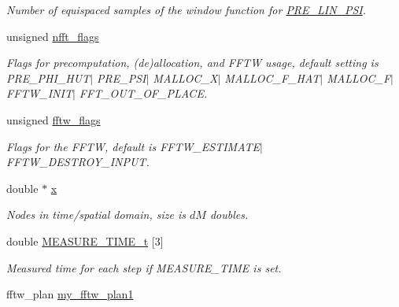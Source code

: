 \begin{CompactItemize}
\begin{CompactList}\small\item\em Number of equispaced samples of the window function for \hyperlink{group__nfft_gbb1ad048b695cb806baf010c5d1b2caf}{PRE\_\-LIN\_\-PSI}. \item\end{CompactList}\item 
\hypertarget{structnfft__plan_2721da68a3a5b1846ecca8395d76bb1d}{
unsigned \hyperlink{structnfft__plan_2721da68a3a5b1846ecca8395d76bb1d}{nfft\_\-flags}}
\label{structnfft__plan_2721da68a3a5b1846ecca8395d76bb1d}

\begin{CompactList}\small\item\em Flags for precomputation, (de)allocation, and FFTW usage, default setting is PRE\_\-PHI\_\-HUT$|$ PRE\_\-PSI$|$ MALLOC\_\-X$|$ MALLOC\_\-F\_\-HAT$|$ MALLOC\_\-F$|$ FFTW\_\-INIT$|$ FFT\_\-OUT\_\-OF\_\-PLACE. \item\end{CompactList}\item 
\hypertarget{structnfft__plan_530aea04dba32fb2a41287b4581b1805}{
unsigned \hyperlink{structnfft__plan_530aea04dba32fb2a41287b4581b1805}{fftw\_\-flags}}
\label{structnfft__plan_530aea04dba32fb2a41287b4581b1805}

\begin{CompactList}\small\item\em Flags for the FFTW, default is FFTW\_\-ESTIMATE$|$ FFTW\_\-DESTROY\_\-INPUT. \item\end{CompactList}\item 
\hypertarget{structnfft__plan_7eb64fb5fedfba0ec75261e777e020c0}{
double $\ast$ \hyperlink{structnfft__plan_7eb64fb5fedfba0ec75261e777e020c0}{x}}
\label{structnfft__plan_7eb64fb5fedfba0ec75261e777e020c0}

\begin{CompactList}\small\item\em Nodes in time/spatial domain, size is $dM$ doubles. \item\end{CompactList}\item 
\hypertarget{structnfft__plan_7c3e5504175fa292a6a5d0c0e1d7f848}{
double \hyperlink{structnfft__plan_7c3e5504175fa292a6a5d0c0e1d7f848}{MEASURE\_\-TIME\_\-t} \mbox{[}3\mbox{]}}
\label{structnfft__plan_7c3e5504175fa292a6a5d0c0e1d7f848}

\begin{CompactList}\small\item\em Measured time for each step if MEASURE\_\-TIME is set. \item\end{CompactList}\item 
\hypertarget{structnfft__plan_84d87c06b22ddb3e725c61061cf4d46d}{
fftw\_\-plan \hyperlink{structnfft__plan_84d87c06b22ddb3e725c61061cf4d46d}{my\_\-fftw\_\-plan1}}
\label{structnfft__plan_84d87c06b22ddb3e725c61061cf4d46d}


\end{CompactItemize}
